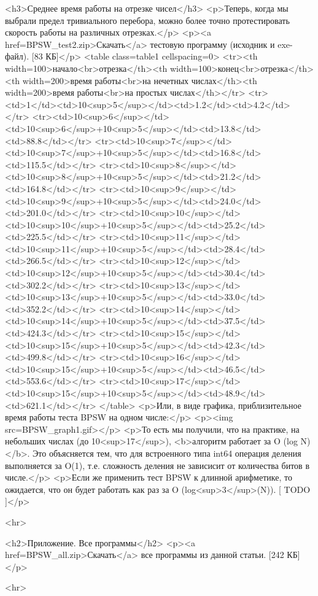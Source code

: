 <h3>Среднее время работы на отрезке чисел</h3>
<p>Теперь, когда мы выбрали предел тривиального перебора, можно более точно протестировать скорость работы на различных отрезках.</p>
<p><a href=BPSW_test2.zip>Скачать</a> тестовую программу (исходник и exe-файл). [83 КБ]</p>
<table class=table1 cellspacing=0>
<tr><th width=100>начало<br>отрезка</th><th width=100>конец<br>отрезка</th><th width=200>время работы<br>на нечетных числах</th><th width=200>время работы<br>на простых числах</th></tr>
<tr><td>1</td><td>10<sup>5</sup></td><td>1.2</td><td>4.2</td></tr>
<tr><td>10<sup>6</sup></td><td>10<sup>6</sup>+10<sup>5</sup></td><td>13.8</td><td>88.8</td></tr>
<tr><td>10<sup>7</sup></td><td>10<sup>7</sup>+10<sup>5</sup></td><td>16.8</td><td>115.5</td></tr>
<tr><td>10<sup>8</sup></td><td>10<sup>8</sup>+10<sup>5</sup></td><td>21.2</td><td>164.8</td></tr>
<tr><td>10<sup>9</sup></td><td>10<sup>9</sup>+10<sup>5</sup></td><td>24.0</td><td>201.0</td></tr>
<tr><td>10<sup>10</sup></td><td>10<sup>10</sup>+10<sup>5</sup></td><td>25.2</td><td>225.5</td></tr>
<tr><td>10<sup>11</sup></td><td>10<sup>11</sup>+10<sup>5</sup></td><td>28.4</td><td>266.5</td></tr>
<tr><td>10<sup>12</sup></td><td>10<sup>12</sup>+10<sup>5</sup></td><td>30.4</td><td>302.2</td></tr>
<tr><td>10<sup>13</sup></td><td>10<sup>13</sup>+10<sup>5</sup></td><td>33.0</td><td>352.2</td></tr>
<tr><td>10<sup>14</sup></td><td>10<sup>14</sup>+10<sup>5</sup></td><td>37.5</td><td>424.3</td></tr>
<tr><td>10<sup>15</sup></td><td>10<sup>15</sup>+10<sup>5</sup></td><td>42.3</td><td>499.8</td></tr>
<tr><td>10<sup>16</sup></td><td>10<sup>15</sup>+10<sup>5</sup></td><td>46.5</td><td>553.6</td></tr>
<tr><td>10<sup>17</sup></td><td>10<sup>15</sup>+10<sup>5</sup></td><td>48.9</td><td>621.1</td></tr>
</table>
<p>Или, в виде графика, приблизительное время работы теста BPSW на одном числе:</p>
<p><img src=BPSW_graph1.gif></p>
<p>То есть мы получили, что на практике, на небольших числах (до 10<sup>17</sup>), <b>алгоритм работает за O (log N)</b>. Это объясняется тем, что для встроенного типа int64 операция деления выполняется за O(1), т.е. сложность деления не зависисит от количества битов в числе.</p>
<p>Если же применить тест BPSW к длинной арифметике, то ожидается, что он будет работать как раз за O (log<sup>3</sup>(N)). [ TODO ]</p>

<hr>

<h2>Приложение. Все программы</h2>
<p><a href=BPSW_all.zip>Скачать</a> все программы из данной статьи. [242 КБ]</p>

<hr>

